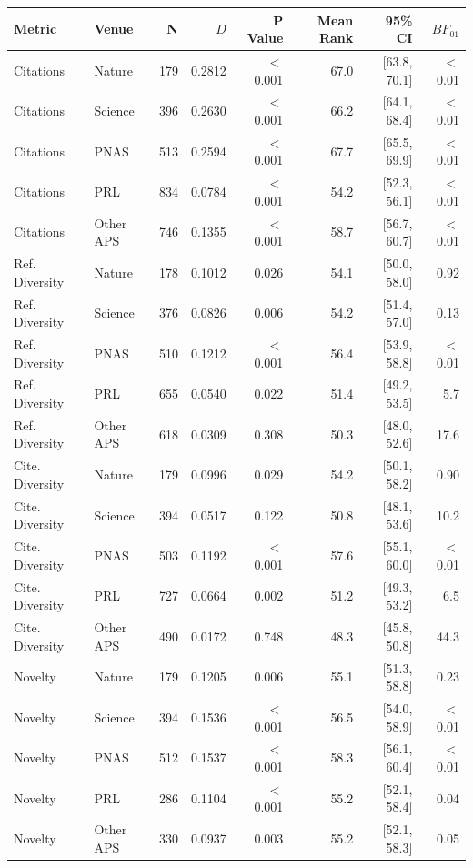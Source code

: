\begin{tabular}{llrrrrrr}
  \toprule
Metric & Venue & N & $D$ & P Value & Mean Rank & 95\% CI & $BF_{01}$ \\ 
  \midrule
  Citations & Nature & 179 & 0.2812 & $<$0.001 & 67.0 & [63.8, 70.1] & $<$0.01 \\ 
  Citations & Science & 396 & 0.2630 & $<$0.001 & 66.2 & [64.1, 68.4] & $<$0.01 \\ 
  Citations & PNAS & 513 & 0.2594 & $<$0.001 & 67.7 & [65.5, 69.9] & $<$0.01 \\ 
  Citations & PRL & 834 & 0.0784 & $<$0.001 & 54.2 & [52.3, 56.1] & $<$0.01 \\ 
  Citations & Other APS & 746 & 0.1355 & $<$0.001 & 58.7 & [56.7, 60.7] & $<$0.01 \\ 
  Ref. Diversity & Nature & 178 & 0.1012 & 0.026 & 54.1 & [50.0, 58.0] & 0.92 \\ 
  Ref. Diversity & Science & 376 & 0.0826 & 0.006 & 54.2 & [51.4, 57.0] & 0.13 \\ 
  Ref. Diversity & PNAS & 510 & 0.1212 & $<$0.001 & 56.4 & [53.9, 58.8] & $<$0.01 \\ 
  Ref. Diversity & PRL & 655 & 0.0540 & 0.022 & 51.4 & [49.2, 53.5] & 5.7 \\ 
  Ref. Diversity & Other APS & 618 & 0.0309 & 0.308 & 50.3 & [48.0, 52.6] & 17.6 \\ 
  Cite. Diversity & Nature & 179 & 0.0996 & 0.029 & 54.2 & [50.1, 58.2] & 0.90 \\ 
  Cite. Diversity & Science & 394 & 0.0517 & 0.122 & 50.8 & [48.1, 53.6] & 10.2 \\ 
  Cite. Diversity & PNAS & 503 & 0.1192 & $<$0.001 & 57.6 & [55.1, 60.0] & $<$0.01 \\ 
  Cite. Diversity & PRL & 727 & 0.0664 & 0.002 & 51.2 & [49.3, 53.2] & 6.5 \\ 
  Cite. Diversity & Other APS & 490 & 0.0172 & 0.748 & 48.3 & [45.8, 50.8] & 44.3 \\ 
  Novelty & Nature & 179 & 0.1205 & 0.006 & 55.1 & [51.3, 58.8] & 0.23 \\ 
  Novelty & Science & 394 & 0.1536 & $<$0.001 & 56.5 & [54.0, 58.9] & $<$0.01 \\ 
  Novelty & PNAS & 512 & 0.1537 & $<$0.001 & 58.3 & [56.1, 60.4] & $<$0.01 \\ 
  Novelty & PRL & 286 & 0.1104 & $<$0.001 & 55.2 & [52.1, 58.4] & 0.04 \\ 
  Novelty & Other APS & 330 & 0.0937 & 0.003 & 55.2 & [52.1, 58.3] & 0.05 \\ 
   \bottomrule
\end{tabular}
